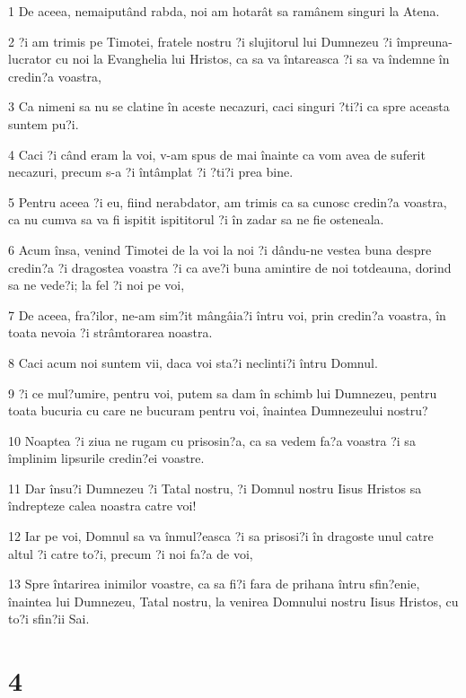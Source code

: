 \par 1 De aceea, nemaiputând rabda, noi am hotarât sa ramânem singuri la Atena.
\par 2 ?i am trimis pe Timotei, fratele nostru ?i slujitorul lui Dumnezeu ?i împreuna-lucrator cu noi la Evanghelia lui Hristos, ca sa va întareasca ?i sa va îndemne în credin?a voastra,
\par 3 Ca nimeni sa nu se clatine în aceste necazuri, caci singuri ?ti?i ca spre aceasta suntem pu?i.
\par 4 Caci ?i când eram la voi, v-am spus de mai înainte ca vom avea de suferit necazuri, precum s-a ?i întâmplat ?i ?ti?i prea bine.
\par 5 Pentru aceea ?i eu, fiind nerabdator, am trimis ca sa cunosc credin?a voastra, ca nu cumva sa va fi ispitit ispititorul ?i în zadar sa ne fie osteneala.
\par 6 Acum însa, venind Timotei de la voi la noi ?i dându-ne vestea buna despre credin?a ?i dragostea voastra ?i ca ave?i buna amintire de noi totdeauna, dorind sa ne vede?i; la fel ?i noi pe voi,
\par 7 De aceea, fra?ilor, ne-am sim?it mângâia?i întru voi, prin credin?a voastra, în toata nevoia ?i strâmtorarea noastra.
\par 8 Caci acum noi suntem vii, daca voi sta?i neclinti?i întru Domnul.
\par 9 ?i ce mul?umire, pentru voi, putem sa dam în schimb lui Dumnezeu, pentru toata bucuria cu care ne bucuram pentru voi, înaintea Dumnezeului nostru?
\par 10 Noaptea ?i ziua ne rugam cu prisosin?a, ca sa vedem fa?a voastra ?i sa împlinim lipsurile credin?ei voastre.
\par 11 Dar însu?i Dumnezeu ?i Tatal nostru, ?i Domnul nostru Iisus Hristos sa îndrepteze calea noastra catre voi!
\par 12 Iar pe voi, Domnul sa va înmul?easca ?i sa prisosi?i în dragoste unul catre altul ?i catre to?i, precum ?i noi fa?a de voi,
\par 13 Spre întarirea inimilor voastre, ca sa fi?i fara de prihana întru sfin?enie, înaintea lui Dumnezeu, Tatal nostru, la venirea Domnului nostru Iisus Hristos, cu to?i sfin?ii Sai.

\chapter{4}

